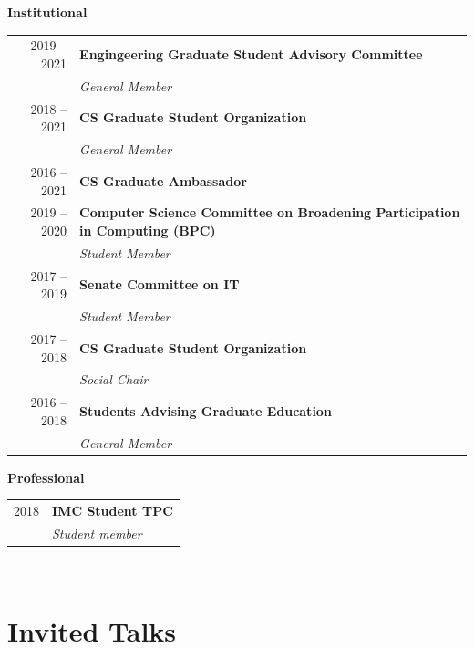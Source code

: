 \documentclass[10pt,singlecolumn]{article} %
\begin{document}
\textbf{Institutional}\\

\begin{tabular}{rl}

2019 -- \textsc{2021} & \textbf{Engingeering Graduate Student Advisory Committee}\\
& \emph{General Member} \\

2018 -- \textsc{2021} & \textbf{CS Graduate Student Organization}\\
& \emph{General Member} \\

2016 -- \textsc{2021} & \textbf{CS Graduate Ambassador}\\

2019 -- 2020 & \textbf{Computer Science Committee on Broadening Participation in Computing (BPC)} \\
& \emph{Student Member} \\

2017 -- 2019 & \textbf{Senate Committee on IT} \\
& \emph{Student Member} \\

2017 -- 2018 & \textbf{CS Graduate Student Organization}\\
& \emph{Social Chair} \\

2016 -- 2018 & \textbf{Students Advising Graduate Education}\\
& \emph{General Member} \\

\end{tabular} 

\vspace{0.3cm}
\textbf{Professional}\\

\begin{tabular}{rl}
2018 & \textbf{IMC Student TPC} \\
& \emph{Student member}\\
\end{tabular} \\


\section{Invited Talks} 
\end{document}
